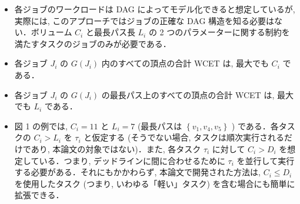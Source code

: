 \begin{frame}{}
    \begin{itemize}
        \item 各ジョブのワークロードは DAG によってモデル化できると想定しているが, 実際には, このアプローチではジョブの正確な DAG 構造を知る必要はない．ボリューム $C_{i}$ と最長パス長 $L_{i}$ の 2 つのパラメーターに関する制約を満たすタスクのジョブのみが必要である．
    \end{itemize}
    \begin{itemize}
        \item  各ジョブ $J_{i}$ の $G\left(J_{i}\right)$ 内のすべての頂点の合計 WCET は, 最大でも $C_{i}$ である．

        \item  各ジョブ $J_{i}$ の $G\left(J_{i}\right)$ の最長パス上のすべての頂点の合計 WCET は, 最大でも $L_{i}$ である．

    \end{itemize}
\end{frame}

\begin{frame}{}
    \begin{itemize}
        \item 図 1 の例では,  $C_{i}=11$ と $L_{i}=7$ (最長パスは $\left\{v_{1}, v_{4}, v_{5}\right\}$ ) である．各タスクの $C_{i}>L_{i}$ を $\tau_{i}$ と仮定する (そうでない場合, タスクは順次実行されるだけであり, 本論文の対象ではない)．また, 各タスク $\tau_{i}$ に対して $C_{i}>D_{i}$ を想定している．つまり, デッドラインに間に合わせるために $\tau_{i}$ を並行して実行する必要がある．それにもかかわらず, 本論文で開発された方法は, $C_{i} \leq D_{i}$ を使用したタスク (つまり, いわゆる「軽い」タスク) を含む場合にも簡単に拡張できる．
    \end{itemize}
\end{frame}
